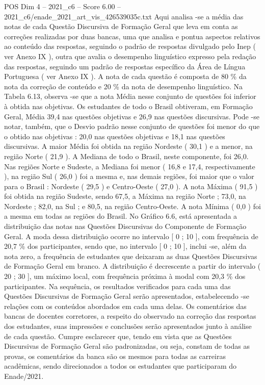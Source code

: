 \begin{textsample}{POS Dim 4 – 2021\_c6 – Score 6.00 – 2021\_c6/enade\_2021\_art\_vis\_426539035c.txt}
Aqui analisa -se a média das notas de cada Questão Discursiva de Formação Geral que leva em conta as correções realizadas por duas bancas, uma que analisa e pontua aspectos relativos ao conteúdo das respostas, seguindo o padrão de respostas divulgado pelo Inep ( ver Anexo IX ), outra que avalia o desempenho linguístico expresso pela redação das respostas, seguindo um padrão de respostas específico da Área de Língua Portuguesa ( ver Anexo IX ).
A nota de cada questão é composta de 80 \% da nota da correção de conteúdo e 20 \% da nota de desempenho linguístico.
Na Tabela 6.13, observa -se que a nota Média nesse conjunto de questões foi inferior à obtida nas objetivas.
Os estudantes de todo o Brasil obtiveram, em Formação Geral, Média 39,4 nas questões objetivas e 26,9 nas questões discursivas.
Pode -se notar, também, que o Desvio padrão nesse conjunto de questões foi menor do que o obtido nas objetivas : 20,0 nas questões objetivas e 18,1 nas questões discursivas.
A maior Média foi obtida na região Nordeste ( 30,1 ) e a menor, na região Norte ( 21,9 ).
A Mediana de todo o Brasil, neste componente, foi 26,0.
Nas regiões Norte e Sudeste, a Mediana foi menor ( 16,8 e 17,4, respectivamente ), na região Sul ( 26,0 ) foi a mesma e, nas demais regiões, foi maior que o valor para o Brasil : Nordeste ( 29,5 ) e Centro-Oeste ( 27,0 ).
A nota Máxima ( 91,5 ) foi obtida na região Sudeste, sendo 67,5, a Máxima na região Norte ; 73,0, na Nordeste ; 82,0, na Sul ; e 80,5, na região Centro-Oeste.
A nota Mínima ( 0,0 ) foi a mesma em todas as regiões do Brasil.
No Gráfico 6.6, está apresentada a distribuição das notas nas Questões Discursivas do Componente de Formação Geral.
A moda dessa distribuição ocorre no intervalo [ 0 ; 10 ], com frequência de 20,7 \% dos participantes, sendo que, no intervalo [ 0 ; 10 ], inclui -se, além da nota zero, a frequência de estudantes que deixaram as duas Questões Discursivas de Formação Geral em branco.
A distribuição é decrescente a partir do intervalo ( 20 ; 30 ], um máximo local, com frequência próxima à modal com 20,3 \% dos participantes.
Na sequência, os resultados verificados para cada uma das Questões Discursivas de Formação Geral serão apresentados, estabelecendo -se relações com os conteúdos abordados em cada uma delas.
Os comentários das bancas de docentes corretores, a respeito do observado na correção das respostas dos estudantes, suas impressões e conclusões serão apresentados junto à análise de cada questão.
Cumpre esclarecer que, tendo em vista que as Questões Discursivas de Formação Geral são padronizadas, ou seja, constam de todas as provas, os comentários da banca são os mesmos para todas as carreiras acadêmicas, sendo direcionados a todos os estudantes que participaram do Enade/2021.

\end{textsample}
